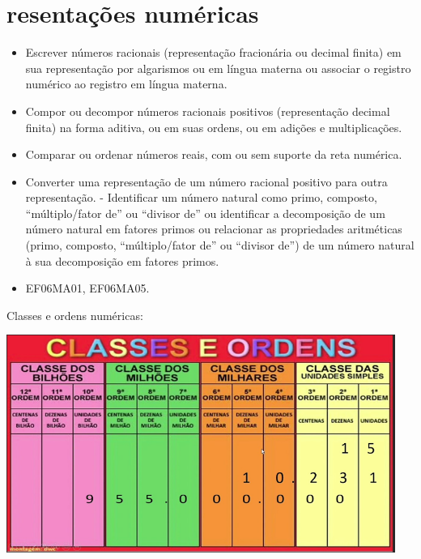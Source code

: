 


\chapter{resentações numéricas}




\begin{itemize}
\item
  Escrever números racionais (representação fracionária ou decimal
  finita) em sua representação por algarismos ou em língua materna ou
  associar o registro numérico ao registro em língua materna.
\item
  Compor ou decompor números racionais positivos (representação decimal
  finita) na forma aditiva, ou em suas ordens, ou em adições e
  multiplicações.
\item
  Comparar ou ordenar números reais, com ou sem suporte da reta
  numérica.
\item
  Converter uma representação de um número racional positivo para outra
  representação. - Identificar um número natural como primo, composto,
  ``múltiplo/fator de'' ou ``divisor de'' ou identificar a decomposição
  de um número natural em fatores primos ou relacionar as propriedades
  aritméticas (primo, composto, ``múltiplo/fator de'' ou ``divisor de'')
  de um número natural à sua decomposição em fatores primos.
\end{itemize}


\begin{itemize} 
\item  EF06MA01, EF06MA05.
\end{itemize}

Classes e ordens numéricas:


\includegraphics[width=5in,height=2.80208in]{./imgSAEB_6_MAT/media/image1.png}

